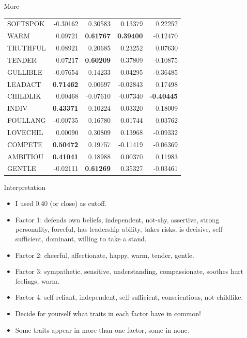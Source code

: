 \documentclass[pdf]{prosper}
\begin{document}
\begin{slide}{More}
{\scriptsize
\begin{tabular}{lrrrr}
\hline
 SOFTSPOK     & -0.30162   &    0.30583   &      0.13379  &     0.22252 \\
 WARM         &  0.09721   &  {\bf  0.61767}   &   {\bf   0.39400}  &    -0.12470 \\
 TRUTHFUL     &  0.08921   &    0.20685   &      0.23252  &     0.07630 \\
 TENDER       &  0.07217   &  {\bf  0.60209}   &      0.37809  &    -0.10875 \\
 GULLIBLE     & -0.07654   &    0.14233   &      0.04295  &    -0.36485 \\
 LEADACT      &  {\bf 0.71462}   &    0.00697   &     -0.02843  &     0.17498 \\
 CHILDLIK     &  0.00468   &   -0.07610   &     -0.07340  &  {\bf  -0.40445} \\
 INDIV        &  {\bf 0.43371}   &    0.10224   &      0.03320  &     0.18009 \\
 FOULLANG     & -0.00735   &    0.16780   &      0.01744  &     0.03762 \\
 LOVECHIL     &  0.00090   &    0.30809   &      0.13968  &    -0.09332 \\
 COMPETE      &  {\bf 0.50472}   &    0.19757   &     -0.11419  &    -0.06369 \\
 AMBITIOU     &  {\bf 0.41041}   &    0.18988   &      0.00370  &     0.11983 \\
 GENTLE       & -0.02111   &  {\bf  0.61269}   &      0.35327  &    -0.03461 \\
\hline
\end{tabular}
}

  
\end{slide}

\begin{slide}{Interpretation}
  \begin{itemize}
  \item I used 0.40 (or close) as cutoff.
  \item Factor 1: defends own beliefs, independent, not-shy, assertive, strong personality, forceful, has leadership ability, takes risks, is decisive, self-sufficient, dominant, willing to take a stand.
  \item Factor 2: cheerful, affectionate, happy, warm, tender, gentle.
  \item Factor 3: sympathetic, sensitive, understanding, compassionate, soothes hurt feelings, warm.
  \item Factor 4: self-reliant, independent, self-sufficient, conscientious, not-childlike.
  \item Decide for yourself what traits in each factor have in common!
  \item Some traits appear in more than one factor, some in none.
  \end{itemize}
\end{slide}
\end{document}

